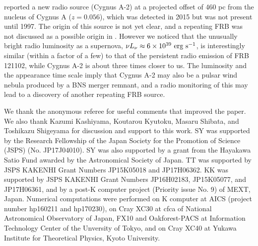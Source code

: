 \documentclass[]{pasj01}
\begin{document}
\citet{Perley2017} reported a new radio source (Cygnus A-2) at a
projected offset of 460 pc from the nucleus of Cygnus A ($z = 0.056$),
which was detected in 2015 but was not present until 1997. The origin
of this source is not yet clear, and a repeating FRB was not discussed
as a possible origin in \citet{Perley2017}.  However we noticed that
the unusually bright radio luminosity as a supernova, $\nu
L_{\nu}\approx6\times10^{39} \ {\rm erg \ s^{-1}}$, is interestingly
similar (within a factor of a few) to that of the persistent radio
emission of FRB 121102, while Cygnus A-2 is about three times closer
to us. The luminosity and the appearance time scale imply that Cygnus
A-2 may also be a pulsar wind nebula produced by a BNS merger remnant,
and a radio monitoring of this may lead to a discovery of another
repeating FRB source.







\begin{ack}
We thank the anonymous referee for useful comments that improved the paper. We also thank Kazumi Kashiyama, Koutarou Kyutoku, Masaru Shibata, and Toshikazu Shigeyama for discussion and support to this work. 
SY was supported by the Research Fellowship of the Japan Society for
the Promotion of Science (JSPS) (No. {\rm JP17J04010}).  SY was also
supported by a grant from the Hayakawa Satio Fund awarded by the
Astronomical Society of Japan. TT was supported by JSPS KAKENHI Grant
Numbers JP15K05018 and JP17H06362.  KK was supported by JSPS KAKENHI
Grant Numbers JP16H02183, JP15K05077, and JP17H06361, and by a post-K
computer project (Priority issue No. 9) of MEXT, Japan.  Numerical
computations were performed on K computer at AICS (project number
hp160211 and hp170230), on Cray XC30 at cfca of National Astronomical
Observatory of Japan, FX10 and Oakforest-PACS at Information
Technology Center of the Unversity of Tokyo, and on Cray XC40 at
Yukawa Institute for Theoretical Physics, Kyoto University.
\end{ack}

 



\end{document}
